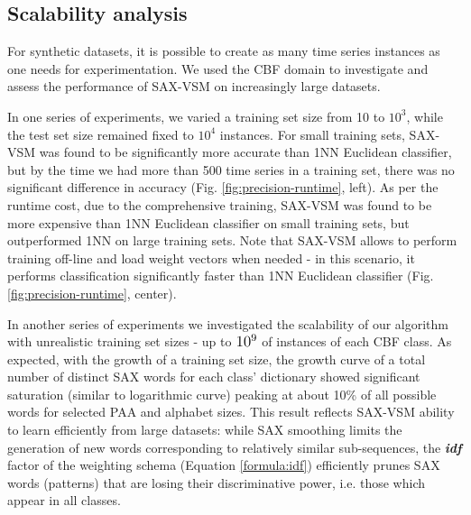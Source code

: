 \documentclass[conference]{IEEEtran}
\begin{document}
\subsection{Scalability analysis} \label{scalability}
For synthetic datasets, it is possible to create as many time series instances as 
one needs for experimentation.
We used the CBF \cite{cbf} domain to investigate and assess the 
performance of SAX-VSM on increasingly large datasets.

In one series of experiments, we varied a training set size from 10 to $10^{3}$, while 
the test set size remained fixed to $10^{4}$ instances. 
For small training sets, SAX-VSM was found to be significantly more accurate than 
1NN Euclidean classifier, but by the time we had more than 500 time series in a training set, 
there was no significant difference in accuracy (Fig. \ref{fig:precision-runtime}, left). 
As per the runtime cost, due to the comprehensive training, SAX-VSM was found to 
be more expensive than 1NN Euclidean classifier on small training sets, 
but outperformed 1NN on large training sets. Note that SAX-VSM allows to perform training 
off-line and load weight vectors when needed - in this scenario, it performs classification 
significantly faster than 1NN Euclidean classifier (Fig. \ref{fig:precision-runtime}, center).

In another series of experiments we investigated the scalability of our algorithm with
unrealistic training set sizes - up to $\normalsize{10^{9}}$ of instances of each CBF class.
As expected, with the growth of a training set size, the growth curve of a total number of 
distinct SAX words for each class' dictionary showed significant saturation 
(similar to logarithmic curve) peaking at about 10\% of all possible words for selected 
PAA and alphabet sizes.
This result reflects SAX-VSM ability to learn efficiently from large datasets: 
while SAX smoothing limits the generation of new words corresponding to 
relatively similar sub-sequences, the \textbf{\textit{idf}} factor of the weighting 
schema (Equation \ref{formula:idf}) efficiently prunes SAX words (patterns) 
that are losing their discriminative power, i.e. those which appear in all classes.

\end{document}
